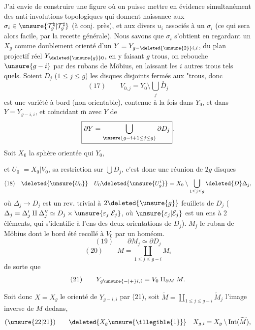 J'ai envie de construire une figure  où
on puisse mettre en évidence simultanément
des anti-involutions topologiques
qui  donnent naissance aux
$\sigma_i\in\unsure{\mathcal{T}_g^{\natural}|\mathcal{T}_g^{\sharp}}$ (à conj. près), et aux divers
$u_i$  associés à un $\sigma_i$ (ce qui sera alors
facile, par la recette générale). Nous
savons que $\sigma_i$  s'obtient en regardant
un $X_g$ comme doublement orienté
d'un $Y=Y_{g-\deleted{\unsure{2}}i,i}$, 
du  plan projectif réel $Y_{\deleted{\unsure{g}}0}$, en
y faisant $g$ trous,  on  rebouche
$\unsure{g-i}$ par des rubans de Möbius, en
laissant les $i$ autres trous tels quels.
Soient $D_j$ ($1\le j\le g$) les disques disjoints
fermés  aux "trous, donc
\[
(17)\qquad \boxed{V_{0,j}=Y_0\setminus\bigcup_j \overset{\circ}{D}_j}
\]
est une variété à bord
(non orientable), contenue à la fois dans
$Y_0$, et dans $Y=Y_{g-i,i}$, et coïncidant
$\overline{\mathrm m}$ avec $Y$  de
\[
\boxed{\partial Y=\bigcup_{\unsure{g-i+1\le j\le g}}\partial D_j}.
\]
 Soit $X_0$ la sphère orientée qui  $Y_0$,

et $U_0$  $=X_0\vert V_0$, sa restriction sur $\bigcup D_j$,
c'est donc  une réunion de $2g$ disques
\[
(18)\quad \deleted{\unsure{U_0}}\quad U_0\deleted{\unsure{U_g^i}}=X_0\setminus\bigcup_{1\le j\le g}\deleted{D}\Delta_j,
\]
où $\Delta_j\longrightarrow D_j$ est un rev. trivial à $2\deleted{\unsure{g}}$
feuillets de $D_j$ ($\Delta_j=\Delta'_j\amalg\Delta''_j\simeq D_j\times\unsure{\varepsilon_j|\mathcal{E}_j}$,
où $\unsure{\varepsilon_j|\mathcal{E}_j}$ est un ens à 2 éléments, qui s'identifie
à l'ens des deux orientations de
$D_j$). 
 $M_j$  le ruban de Möbius dont le bord 
été recollé à $V_0$ par un homéom.
\[
(19)\qquad \partial M_j\simeq\partial D_j
\]
\[
(20)\qquad M=\coprod_{1\le j\le g-i} M_i
\]
de sorte que
\[
(21)\qquad Y_{g\unsure{-|+}i,i}=V_0\amalg_{\partial M}M.
\]


Soit donc $X=X_g$ le  orienté
de $Y_{g-i,i}$  par (21), soit $\widetilde M=\coprod_{1\le j\le g-i}\widetilde M_j$
l'image inverse de $M$ dedans, 
 
\[
(\unsure{22|21})\qquad \deleted{X_g\unsure{\illegible{1}}}\quad X_{g,i}=X_g\setminus\operatorname{Int}(\widetilde M),
\]
